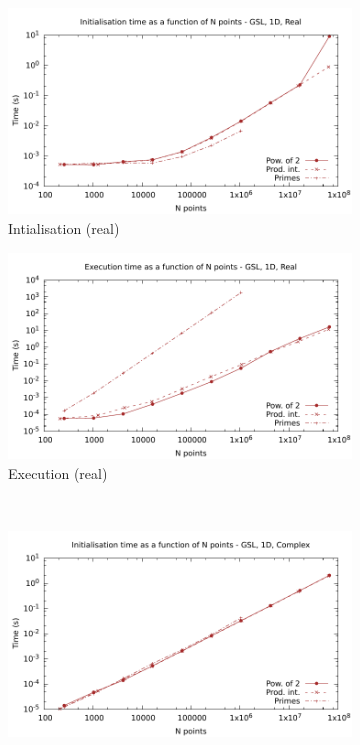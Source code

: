 \documentclass[12pt, a4paper]{article}
\begin{document}
\begin{figure}[htb]
\captionsetup{width=0.8\linewidth}
\centering
\begin{subfigure}{.5\textwidth}
\centering
\includegraphics[width=.9\linewidth]{graphs/1d-gsl-init-r.pdf}
\caption{Intialisation (real)}
\label{1DGSLRI}
\end{subfigure}%
\begin{subfigure}{.5\textwidth}
\centering
\includegraphics[width=.9\linewidth]{graphs/1d-gsl-exec-r.pdf}
\caption{Execution (real)}
\label{1DGSLR}
\end{subfigure}\\
\begin{subfigure}{.5\textwidth}
\centering
\includegraphics[width=.9\linewidth]{graphs/1d-gsl-init-c.pdf}

\end{subfigure}
\end{figure}
\end{document}
